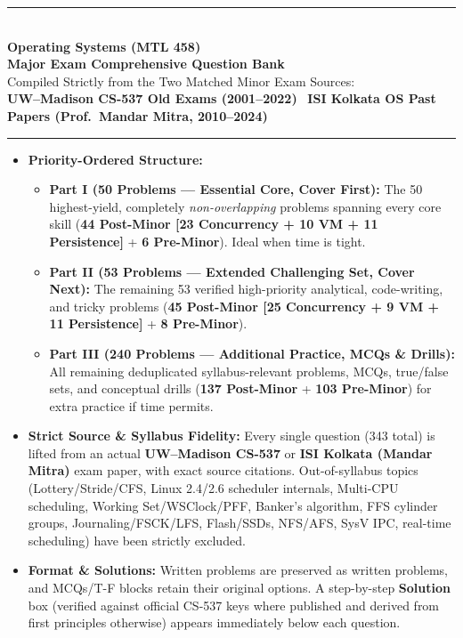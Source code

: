 \documentclass[11pt,a4paper]{article}
\begin{document}
\begin{center}
{\color{rulegray}\rule{\textwidth}{1.2pt}}\\[0.5em]
{\LARGE\bfseries Operating Systems (MTL 458)}\\[0.25em]
{\Large\bfseries Major Exam Comprehensive Question Bank}\\[0.35em]
{\normalsize Compiled Strictly from the Two Matched Minor Exam Sources:}\\
{\normalsize\textbf{UW--Madison CS-537 Old Exams (2001--2022)} \textperiodcentered\ \textbf{ISI Kolkata OS Past Papers (Prof.\ Mandar Mitra, 2010--2024)}}\\[0.35em]
{\color{rulegray}\rule{\textwidth}{1.2pt}}
\end{center}

\vspace{0.35em}
\begin{keybox}
\begin{itemize}
  \item \textbf{Priority-Ordered Structure:}
    \begin{itemize}
      \item \textbf{Part I (50 Problems --- Essential Core, Cover First):} The 50 highest-yield, completely \emph{non-overlapping} problems spanning every core skill (\textbf{44 Post-Minor [23 Concurrency + 10 VM + 11 Persistence]} + \textbf{6 Pre-Minor}). Ideal when time is tight.
      \item \textbf{Part II (53 Problems --- Extended Challenging Set, Cover Next):} The remaining 53 verified high-priority analytical, code-writing, and tricky problems (\textbf{45 Post-Minor [25 Concurrency + 9 VM + 11 Persistence]} + \textbf{8 Pre-Minor}).
      \item \textbf{Part III (240 Problems --- Additional Practice, MCQs \& Drills):} All remaining deduplicated syllabus-relevant problems, MCQs, true/false sets, and conceptual drills (\textbf{137 Post-Minor} + \textbf{103 Pre-Minor}) for extra practice if time permits.
    \end{itemize}
  \item \textbf{Strict Source \& Syllabus Fidelity:} Every single question (343 total) is lifted from an actual \textbf{UW--Madison CS-537} or \textbf{ISI Kolkata (Mandar Mitra)} exam paper, with exact source citations. Out-of-syllabus topics (Lottery/Stride/CFS, Linux 2.4/2.6 scheduler internals, Multi-CPU scheduling, Working Set/WSClock/PFF, Banker's algorithm, FFS cylinder groups, Journaling/FSCK/LFS, Flash/SSDs, NFS/AFS, SysV IPC, real-time scheduling) have been strictly excluded.
  \item \textbf{Format \& Solutions:} Written problems are preserved as written problems, and MCQs/T-F blocks retain their original options. A step-by-step \textbf{Solution} box (verified against official CS-537 keys where published and derived from first principles otherwise) appears immediately below each question.
\end{itemize}
\end{keybox}
\end{document}
